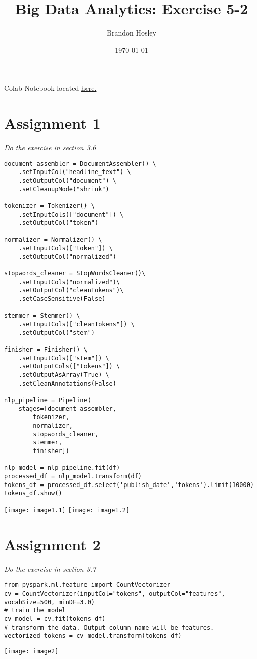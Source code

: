 \documentclass[]{article}
\title{Big Data Analytics: Exercise 5-2}
\author{Brandon Hosley}
\date{\today}
\begin{document}
\maketitle

Colab Notebook located
\href{https://colab.research.google.com/drive/1rxCV1SSGTpGZSGphk5AH8Iuuz3TFCNxB?usp=sharing}{here.}

\section*{Assignment 1}
\emph{ Do the exercise in section 3.6 }

\begin{verbatim}
document_assembler = DocumentAssembler() \
	.setInputCol("headline_text") \
	.setOutputCol("document") \
	.setCleanupMode("shrink")

tokenizer = Tokenizer() \
	.setInputCols(["document"]) \
	.setOutputCol("token")

normalizer = Normalizer() \
	.setInputCols(["token"]) \
	.setOutputCol("normalized")

stopwords_cleaner = StopWordsCleaner()\
	.setInputCols("normalized")\
	.setOutputCol("cleanTokens")\
	.setCaseSensitive(False)

stemmer = Stemmer() \
	.setInputCols(["cleanTokens"]) \
	.setOutputCol("stem")

finisher = Finisher() \
	.setInputCols(["stem"]) \
	.setOutputCols(["tokens"]) \
	.setOutputAsArray(True) \
	.setCleanAnnotations(False)

nlp_pipeline = Pipeline(
	stages=[document_assembler, 
		tokenizer,
		normalizer,
		stopwords_cleaner, 
		stemmer, 
		finisher])

nlp_model = nlp_pipeline.fit(df)
processed_df = nlp_model.transform(df)
tokens_df = processed_df.select('publish_date','tokens').limit(10000)
tokens_df.show()
\end{verbatim}
\texttt{[image: image1.1]}
\texttt{[image: image1.2]}

\section*{Assignment 2}
\emph{ Do the exercise in section 3.7 }

\begin{verbatim}
from pyspark.ml.feature import CountVectorizer
cv = CountVectorizer(inputCol="tokens", outputCol="features", 
vocabSize=500, minDF=3.0)
# train the model
cv_model = cv.fit(tokens_df)
# transform the data. Output column name will be features.
vectorized_tokens = cv_model.transform(tokens_df)
\end{verbatim}
\texttt{[image: image2]} 
\end{document}
